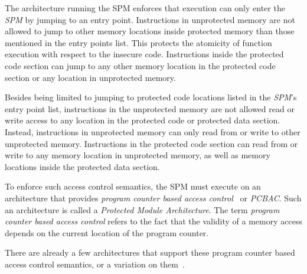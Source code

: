 The architecture running the SPM enforces that execution can only enter the \emph{SPM} by jumping to an entry point.
Instructions in unprotected memory are not allowed to jump to other memory locations inside protected memory than those mentioned in the entry points list.
This protects the atomicity of function execution with respect to the insecure code.
Instructions inside the protected code section can jump to any other memory location in the protected code section or any location in unprotected memory.

Besides being limited to jumping to protected code locations listed in the \emph{SPM}'s entry point list, instructions in the unprotected memory are not allowed read or write access to any location in the protected code or protected data section.
Instead, instructions in unprotected memory can only read from or write to other unprotected memory.
Instructions in the protected code section can read from or write to any memory location in unprotected memory, as well as memory locations inside the protected data section.


%

To enforce such access control semantics, the SPM must execute on an architecture that provides \emph{program counter based access control}~\cite{PCBAC} or \emph{PCBAC}.
Such an architecture is called a \emph{Protected Module Architecture}.
The term \emph{program counter based access control} refers to the fact that the validity of a memory access depends on the current location of the program counter.

There are already a few architectures that support these program counter based access control semantics, or a variation on them~\cite{Fides, Salus, Sancus, SGX}.

